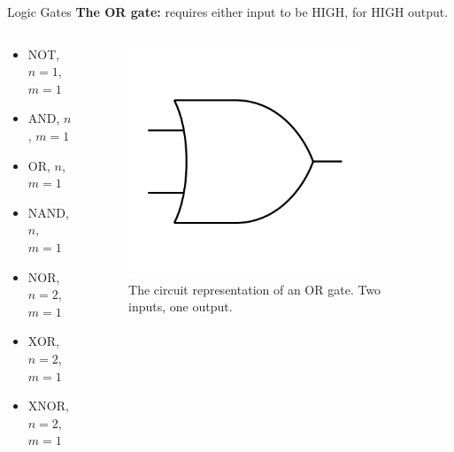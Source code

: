\documentclass{beamer}
\begin{document}
\begin{frame}{Logic Gates}
\textbf{The OR gate:} requires either input to be HIGH, for HIGH output. \\ \vspace{0.5cm}
\begin{columns}[T]
\begin{column}{0.5\textwidth}
\begin{itemize}
\item \alert{NOT, $n=1$, $m=1$}
\item \alert{AND, $n$, $m=1$}
\item \alert{OR, $n$, $m=1$}
\item NAND, $n$, $m=1$
\item NOR, $n=2$, $m=1$
\item XOR, $n=2$, $m=1$
\item XNOR, $n=2$, $m=1$
\end{itemize}
\end{column}
\begin{column}{0.5\textwidth}
\begin{figure}
\centering
\includegraphics[width=0.8\textwidth,trim=0cm 2cm 0cm 2cm,clip=true]{figures/BasicOR.pdf}
\caption{\label{fig:or} The circuit representation of an OR gate.  Two inputs, one output.}
\end{figure}
\end{column}
\end{columns}
\end{frame}
\end{document}
